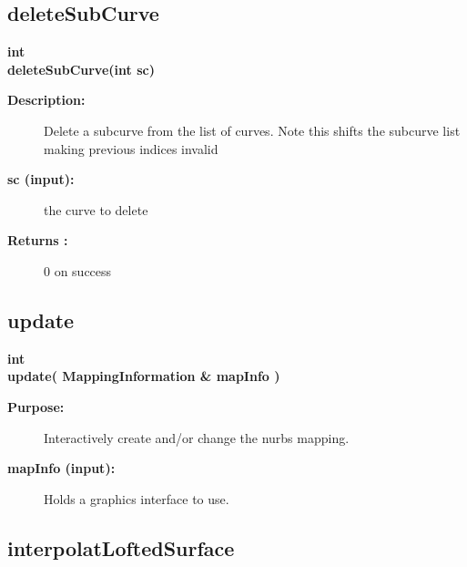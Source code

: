 \subsection{deleteSubCurve}
 
\begin{flushleft} \textbf{%
int  \\ 
\settowidth{\NurbsMappingIncludeArgIndent}{deleteSubCurve(}%
deleteSubCurve(int sc)
}\end{flushleft}
\begin{description}
\item[{\bf Description:}] 
   Delete a subcurve from the list of curves.  Note this shifts the subcurve list
    making previous indices invalid
\item[{\bf sc (input):}]  the curve to delete
\item[{\bf Returns :}]  0 on success
\end{description}
\subsection{update}
 
\begin{flushleft} \textbf{%
int  \\ 
\settowidth{\NurbsMappingIncludeArgIndent}{update(}%
update( MappingInformation \& mapInfo ) 
}\end{flushleft}
\begin{description}
\item[{\bf Purpose:}]  Interactively create and/or change the nurbs mapping.
\item[{\bf mapInfo (input):}]  Holds a graphics interface to use.
\end{description}
\subsection{interpolatLoftedSurface}
 
